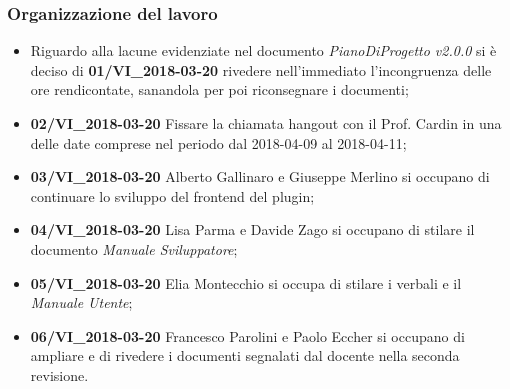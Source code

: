 \documentclass[a4paper, oneside, openany]{article}
\begin{document}
	\subsubsection{Organizzazione del lavoro}
    \begin{itemize}
    	
   	\item Riguardo alla lacune evidenziate nel documento \emph{PianoDiProgetto v2.0.0} si è deciso di \textbf{ 01/VI\_2018-03-20 } rivedere nell'immediato l'incongruenza delle ore rendicontate, sanandola per poi riconsegnare i documenti;

    	\item  \textbf{ 02/VI\_2018-03-20 } Fissare la chiamata hangout con il Prof. Cardin in una delle date comprese nel periodo dal 2018-04-09 al 2018-04-11; 
    	\item  \textbf{ 03/VI\_2018-03-20 } Alberto Gallinaro e Giuseppe Merlino si occupano di continuare lo sviluppo del frontend del plugin;
    	\item  \textbf{ 04/VI\_2018-03-20 } Lisa Parma e Davide Zago si occupano di stilare il documento \emph{Manuale Sviluppatore};
    	
    	\item  \textbf{ 05/VI\_2018-03-20 } Elia Montecchio si occupa di stilare i verbali e il \emph{Manuale Utente};
    	 
  	\item  \textbf{ 06/VI\_2018-03-20 } Francesco Parolini e Paolo Eccher si occupano di ampliare e di rivedere i documenti segnalati dal docente nella seconda revisione.

  		  		
  
\end{itemize}
  

	
\end{document}
